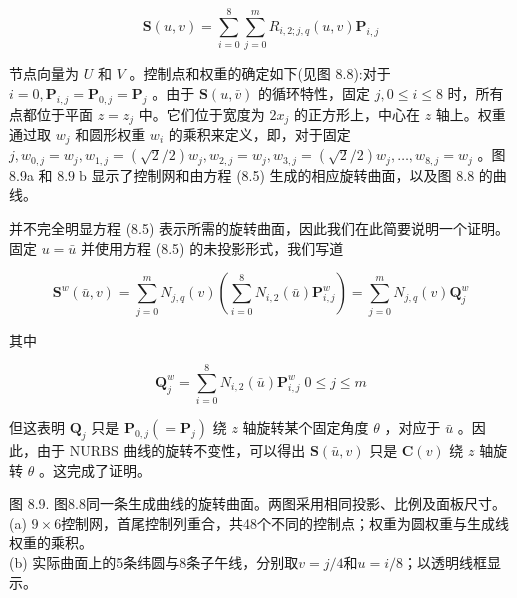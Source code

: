 \documentclass[../main.tex]{subfiles}
\begin{document}
\[
\mathbf{S}\left( {u,v}\right)  = \mathop{\sum }\limits_{{i = 0}}^{8}\mathop{\sum }\limits_{{j = 0}}^{m}{R}_{i,2;j,q}\left( {u,v}\right) {\mathbf{P}}_{i,j} \tag{8.5}
\]

节点向量为 \(U\) 和 \(V\) 。控制点和权重的确定如下(见图 8.8):对于 \(i = 0,{\mathbf{P}}_{i,j} = {\mathbf{P}}_{0,j} = {\mathbf{P}}_{j}\) 。由于 \(\mathbf{S}\left( {u,\bar{v}}\right)\) 的循环特性，固定 \(j,0 \leq  i \leq  8\) 时，所有点都位于平面 \(z = {z}_{j}\) 中。它们位于宽度为 \(2{x}_{j}\) 的正方形上，中心在 \(z\) 轴上。权重通过取 \({w}_{j}\) 和圆形权重 \({w}_{i}\) 的乘积来定义，即，对于固定 \(j,{w}_{0,j} = {w}_{j},{w}_{1,j} = \left( {\sqrt{2}/2}\right) {w}_{j},{w}_{2,j} = {w}_{j},{w}_{3,j} = \left( {\sqrt{2}/2}\right) {w}_{j},\ldots ,{w}_{8,j} = {w}_{j}\) 。图 8.9a 和 \({8.9}\mathrm{\;b}\) 显示了控制网和由方程 (8.5) 生成的相应旋转曲面，以及图 8.8 的曲线。

并不完全明显方程 (8.5) 表示所需的旋转曲面，因此我们在此简要说明一个证明。固定 \(u = \bar{u}\) 并使用方程 (8.5) 的未投影形式，我们写道

\[
{\mathbf{S}}^{w}\left( {\bar{u},v}\right)  = \mathop{\sum }\limits_{{j = 0}}^{m}{N}_{j,q}\left( v\right) \left( {\mathop{\sum }\limits_{{i = 0}}^{8}{N}_{i,2}\left( \bar{u}\right) {\mathbf{P}}_{i,j}^{w}}\right)  = \mathop{\sum }\limits_{{j = 0}}^{m}{N}_{j,q}\left( v\right) {\mathbf{Q}}_{j}^{w}
\]

其中

\[
{\mathbf{Q}}_{j}^{w} = \mathop{\sum }\limits_{{i = 0}}^{8}{N}_{i,2}\left( \bar{u}\right) {\mathbf{P}}_{i,j}^{w}\;0 \leq  j \leq  m
\]

但这表明 \({\mathbf{Q}}_{j}\) 只是 \({\mathbf{P}}_{0,j}\left( { = {\mathbf{P}}_{j}}\right)\) 绕 \(z\) 轴旋转某个固定角度 \(\theta\) ，对应于 \(\bar{u}\) 。因此，由于 NURBS 曲线的旋转不变性，可以得出 \(\mathbf{S}\left( {\bar{u},v}\right)\) 只是 \(\mathbf{C}\left( v\right)\) 绕 \(z\) 轴旋转 \(\theta\) 。这完成了证明。

\begin{center}
\begin{minipage}{34cm}
\vspace*{.6\baselineskip}
\centering
{}
\par\smallskip
图 8.9. 图8.8同一条生成曲线的旋转曲面。两图采用相同投影、比例及面板尺寸。\\
(a) $9\times6$控制网，首尾控制列重合，共48个不同的控制点；权重为圆权重与生成线权重的乘积。\\
(b) 实际曲面上的5条纬圆与8条子午线，分别取$v=j/4$和$u=i/8$；以透明线框显示。
\end{minipage}
\end{center}
\end{document}
